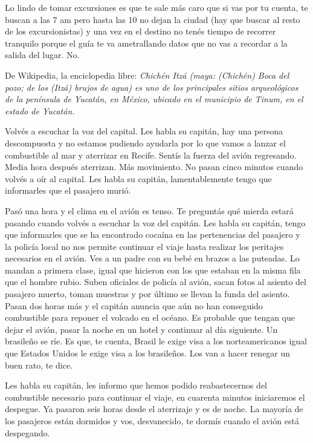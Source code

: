 \documentclass[11pt,twoside,openright,a6paper]{book}
\begin{document}
\vspace{1.5cm}
Lo lindo de tomar excursiones es que te sale más caro que si vas por tu cuenta, te buscan a las 7 am pero hasta las 10 no dejan la ciudad (hay que buscar al resto de los excursionistas) y una vez en el destino no tenés tiempo de recorrer tranquilo porque el guía te va ametrallando datos que no vas a recordar a la salida del lugar. No.


\vspace{1.5cm}
De Wikipedia, la enciclopedia libre: \emph{Chichén Itzá (maya: (Chichén) Boca del pozo; de los (Itzá) brujos de agua) es uno de los principales sitios arqueológicos de la península de Yucatán, en México, ubicado en el municipio de Tinum, en el estado de Yucatán.}


\vspace{1.5cm}
Volvés a escuchar la voz del capital. Les habla su capitán, hay una persona descompuesta y no estamos pudiendo ayudarla por lo que vamos a lanzar el combustible al mar y aterrizar en Recife. Sentís la fuerza del avión regresando. Media hora después aterrizan. Más movimiento. No pasan cinco minutos cuando volvés a oír al capital. Les habla su capitán, lamentablemente tengo que informarles que el pasajero murió.


\vspace{1.5cm}
Pasó una hora y el clima en el avión es tenso. Te preguntás qué mierda estará pasando cuando volvés a escuchar la voz del capitán. Les habla su capitán, tengo que informarles que se ha encontrado cocaína en las pertenencias del pasajero y la policía local no nos permite continuar el viaje hasta realizar los peritajes necesarios en el avión. Ves a un padre con su bebé en brazos a las puteadas. Lo mandan a primera clase, igual que hicieron con los que estaban en la misma fila que el hombre rubio. Suben oficiales de policía al avión, sacan fotos al asiento del pasajero muerto, toman muestras y por último se llevan la funda del asiento. Pasan dos horas más y el capitán anuncia que aún no han conseguido combustible para reponer el volcado en el océano. Es probable que tengan que dejar el avión, pasar la noche en un hotel y continuar al día siguiente. Un brasileño se ríe. Es que, te cuenta, Brasil le exige visa a los norteamericanos igual que Estados Unidos le exige visa a los brasileños. Los van a hacer renegar un buen rato, te dice.


\vspace{1.5cm}
Les habla su capitán, les informo que hemos podido reabastecernos del combustible necesario para continuar el viaje, en cuarenta minutos iniciaremos el despegue. Ya pasaron seis horas desde el aterrizaje y es de noche. La mayoría de los pasajeros están dormidos y vos, desvanecido, te dormís cuando el avión está despegando.
\end{document}
